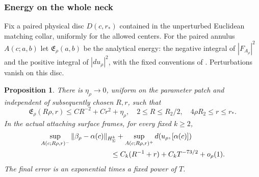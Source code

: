 \documentclass[11pt]{amsart}
\newtheorem{proposition}[theorem]{Proposition}
\theoremstyle{definition}
\theoremstyle{remark}
\theoremstyle{plain}
\begin{document}
\subsubsection{Energy on the whole neck}

Fix a paired physical disc $D(c,r_*)$ contained in the unperturbed
Euclidean matching collar, uniformly for the allowed centers. For the
paired annulus $A(c;a,b)$ let $\mathfrak E_\rho(a,b)$ be the analytical
energy: the negative integral of $|F_{A_\rho}|^2$ and the positive
integral of $|du_\rho|^2$, with the fixed conventions of
\cite[equation~(3.5)]{DaeFukLip21a}. Perturbations vanish on this disc.

\begin{proposition}\label{prop:constructed-neck}
There is $\eta_\rho\to0$, uniform on the parameter patch and independent
of subsequently chosen $R,r$, such that
\begin{equation}\label{eq:constructed-neck-energy}
 \mathfrak E_\rho(R\rho,r)
       \leq CR^{-2}+Cr^2+\eta_\rho,
 \quad 2\leq R\leq R_2/2,\quad 4\rho R_2\leq r\leq r_*.
\end{equation}
In the actual attaching surface frames, for every fixed $k\geq2$,
\begin{equation}\label{eq:constructed-neck-diameter}
 \begin{split}
 &\sup_{A(c;R\rho,r)^-}
       \|\beta_\rho-\alpha(c)\|_{H^k_\Sigma}
   +\sup_{A(c;R\rho,r)^+}d(u_\rho,[\alpha(c)])\\
 &\hspace{35mm}\leq C_k(R^{-1}+r)+C_kT^{-73/2}+o_\rho(1).
 \end{split}
\end{equation}
The final error is an exponential times a fixed power of $T$.
\end{proposition}
\end{document}
